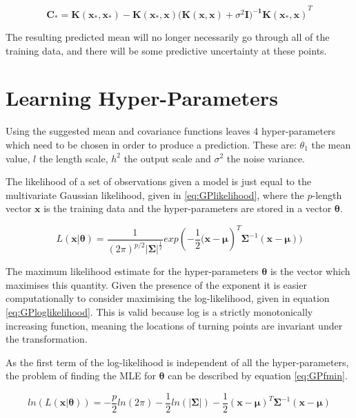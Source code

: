 \documentclass[a4paper,11pt]{report}
\begin{document}
\begin{equation} \label{eq:GP+noisevar}
\mathbf{ C_* = K(x_*,x_*)-K(x_*,x) (K(x,x)}+\sigma^2 \mathbf{I)^{-1} K(x_*,x)}^{T}
\end{equation}

\doublespacing

The resulting predicted mean will no longer necessarily go through all of the training data, and there will be some predictive uncertainty at these points.

\section{Learning Hyper-Parameters}
Using the suggested mean and covariance functions leaves 4 hyper-parameters which need to be chosen in order to produce a prediction. These are: \(\theta_1\) the mean value, \(l\) the length scale, \(h^2\) the output scale and \(\sigma^2\) the noise variance. 

The likelihood of a set of observations given a model is just equal to the multivariate Gaussian likelihood, given in \ref{eq:GPlikelihood}, where the \(p\)-length vector \(\mathbf{x}\) is the training data and the hyper-parameters are stored in a vector \(\mathbf{\theta}\).

\begin{equation} \label{eq:GPlikelihood}
L(\mathbf{x | \theta}) = \frac{1}{(2\pi)^{p/2} |\boldsymbol{\Sigma|}^{\frac{1}{2}}} exp(- \frac{1}{2} \mathbf{(x}-\boldsymbol{\mu})^{T}\boldsymbol{\Sigma}^{-1}(\mathbf{x}-\boldsymbol{\mu}))
\end{equation}

The maximum likelihood estimate for the hyper-parameters \(\mathbf{\theta}\) is the vector which maximises this quantity. Given the presence of the exponent it is easier computationally to consider maximising the log-likelihood, given in equation \ref{eq:GPloglikelihood}. This is valid because log is a strictly monotonically increasing function, meaning the locations of turning points are invariant under the transformation. \par
As the first term of the log-likelihood is independent of all the hyper-parameters, the problem of finding the MLE for \(\boldsymbol{\theta}\) can be described by equation \ref{eq:GPfmin}.

\singlespacing

\begin{equation} \label{eq:GPloglikelihood}
ln(L(\mathbf{x} | \boldsymbol{\theta})) = - \frac{p}{2} ln(2\pi) - \frac{1}{2} ln(|\boldsymbol{\Sigma}|) - \frac{1}{2} (\mathbf{x}-\boldsymbol{\mu})^{T} \boldsymbol{\Sigma}^{-1}(\mathbf{x}-\boldsymbol{\mu})
\end{equation}
\end{document}
